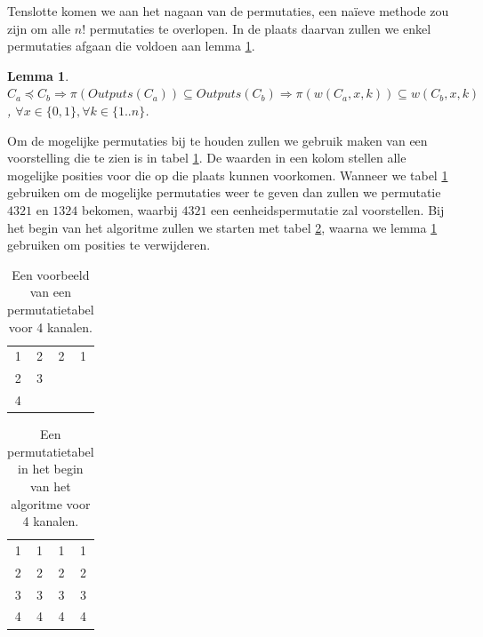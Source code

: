 \documentclass{article}
\newtheorem{lemma}{Lemma}
\begin{document}
Tenslotte komen we aan het nagaan van de permutaties, een na\"ieve methode zou zijn om alle $n!$ permutaties te overlopen.
In de plaats daarvan zullen we enkel permutaties afgaan die voldoen aan lemma \ref{lemma5}.
\begin{lemma}
${C_a \preceq C_b  \Rightarrow \pi\left(Outputs\left(C_{a}\right)\right) \subseteq Outputs\left(C_{b}\right)} \Rightarrow \pi\left(w\left(C_a, x, k\right)\right) \subseteq w\left(C_b, x, k\right)$, ${\forall x \in \{0,1\}, \forall k \in \{1..n\}}$.
\label{lemma5}
\end{lemma} 
Om de mogelijke permutaties bij te houden zullen we gebruik maken van een voorstelling die te zien is in tabel \ref{tabel4}.
De waarden in een kolom stellen alle mogelijke posities voor die op die plaats kunnen voorkomen.
Wanneer we tabel  \ref{tabel4} gebruiken om de mogelijke permutaties weer te geven dan zullen we permutatie $4321$ en $1324$  bekomen, waarbij $4321$ een eenheidspermutatie zal voorstellen.
Bij het begin van het algoritme zullen we starten met tabel \ref{tabel5}, waarna we lemma \ref{lemma5} gebruiken om posities te verwijderen.
\begin{table}[!h]
\centering
\begin{tabular}{|c|c|c|c|}
\hline
1 & 2 & 2 & 1 \\ 
2 & 3 &  &  \\ 
4 &  &  &  \\ 
\hline 
\end{tabular}
\caption{Een voorbeeld van een permutatietabel voor 4 kanalen.}
\label{tabel4}
\end{table}
\begin{table}[!h]
\centering
\begin{tabular}{|c|c|c|c|}
\hline
1 & 1 & 1 & 1 \\ 
2 & 2 & 2 & 2\\ 
3 & 3 & 3 & 3 \\
4 & 4 & 4 & 4\\ 
\hline 
\end{tabular}
\caption{Een permutatietabel in het begin van het algoritme voor 4 kanalen.}
\label{tabel5}
\end{table}
\end{document}
